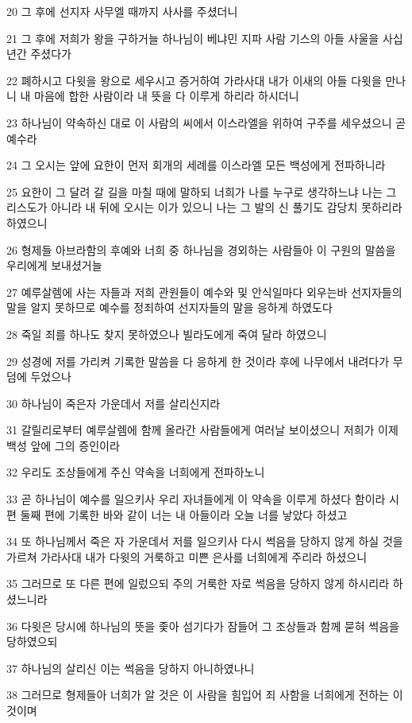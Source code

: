 \par 20 그 후에 선지자 사무엘 때까지 사사를 주셨더니
\par 21 그 후에 저희가 왕을 구하거늘 하나님이 베냐민 지파 사람 기스의 아들 사울을 사십 년간 주셨다가
\par 22 폐하시고 다윗을 왕으로 세우시고 증거하여 가라사대 내가 이새의 아들 다윗을 만나니 내 마음에 합한 사람이라 내 뜻을 다 이루게 하리라 하시더니
\par 23 하나님이 약속하신 대로 이 사람의 씨에서 이스라엘을 위하여 구주를 세우셨으니 곧 예수라
\par 24 그 오시는 앞에 요한이 먼저 회개의 세례를 이스라엘 모든 백성에게 전파하니라
\par 25 요한이 그 달려 갈 길을 마칠 때에 말하되 너희가 나를 누구로 생각하느냐 나는 그리스도가 아니라 내 뒤에 오시는 이가 있으니 나는 그 발의 신 풀기도 감당치 못하리라 하였으니
\par 26 형제들 아브라함의 후예와 너희 중 하나님을 경외하는 사람들아 이 구원의 말씀을 우리에게 보내셨거늘
\par 27 예루살렘에 사는 자들과 저희 관원들이 예수와 및 안식일마다 외우는바 선지자들의 말을 알지 못하므로 예수를 정죄하여 선지자들의 말을 응하게 하였도다
\par 28 죽일 죄를 하나도 찾지 못하였으나 빌라도에게 죽여 달라 하였으니
\par 29 성경에 저를 가리켜 기록한 말씀을 다 응하게 한 것이라 후에 나무에서 내려다가 무덤에 두었으나
\par 30 하나님이 죽은자 가운데서 저를 살리신지라
\par 31 갈릴리로부터 예루살렘에 함께 올라간 사람들에게 여러날 보이셨으니 저희가 이제 백성 앞에 그의 증인이라
\par 32 우리도 조상들에게 주신 약속을 너희에게 전파하노니
\par 33 곧 하나님이 예수를 일으키사 우리 자녀들에게 이 약속을 이루게 하셨다 함이라 시편 둘째 편에 기록한 바와 같이 너는 내 아들이라 오늘 너를 낳았다 하셨고
\par 34 또 하나님께서 죽은 자 가운데서 저를 일으키사 다시 썩음을 당하지 않게 하실 것을 가르쳐 가라사대 내가 다윗의 거룩하고 미쁜 은사를 너희에게 주리라 하셨으니
\par 35 그러므로 또 다른 편에 일렀으되 주의 거룩한 자로 썩음을 당하지 않게 하시리라 하셨느니라
\par 36 다윗은 당시에 하나님의 뜻을 좇아 섬기다가 잠들어 그 조상들과 함께 묻혀 썩음을 당하였으되
\par 37 하나님의 살리신 이는 썩음을 당하지 아니하였나니
\par 38 그러므로 형제들아 너희가 알 것은 이 사람을 힘입어 죄 사함을 너희에게 전하는 이것이며
